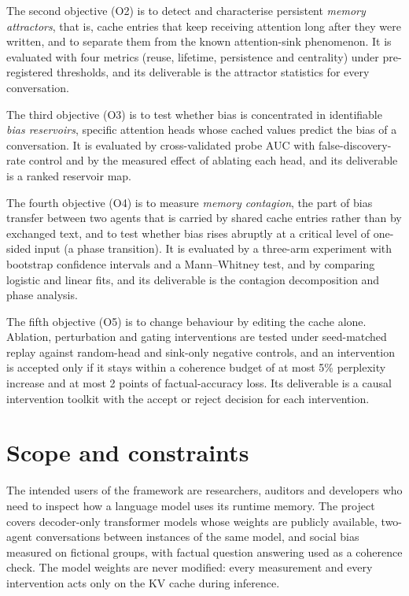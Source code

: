 The second objective (O2) is to detect and characterise persistent \emph{memory attractors}, that is, cache entries that keep receiving attention long after they were written, and to separate them from the known attention-sink phenomenon. It is evaluated with four metrics (reuse, lifetime, persistence and centrality) under pre-registered thresholds, and its deliverable is the attractor statistics for every conversation.

The third objective (O3) is to test whether bias is concentrated in identifiable \emph{bias reservoirs}, specific attention heads whose cached values predict the bias of a conversation. It is evaluated by cross-validated probe AUC with false-discovery-rate control and by the measured effect of ablating each head, and its deliverable is a ranked reservoir map.

The fourth objective (O4) is to measure \emph{memory contagion}, the part of bias transfer between two agents that is carried by shared cache entries rather than by exchanged text, and to test whether bias rises abruptly at a critical level of one-sided input (a phase transition). It is evaluated by a three-arm experiment with bootstrap confidence intervals and a Mann--Whitney test, and by comparing logistic and linear fits, and its deliverable is the contagion decomposition and phase analysis.

The fifth objective (O5) is to change behaviour by editing the cache alone. Ablation, perturbation and gating interventions are tested under seed-matched replay against random-head and sink-only negative controls, and an intervention is accepted only if it stays within a coherence budget of at most 5\% perplexity increase and at most 2 points of factual-accuracy loss. Its deliverable is a causal intervention toolkit with the accept or reject decision for each intervention.

\section{Scope and constraints}
The intended users of the framework are researchers, auditors and developers who need to inspect how a language model uses its runtime memory. The project covers decoder-only transformer models whose weights are publicly available, two-agent conversations between instances of the same model, and social bias measured on fictional groups, with factual question answering used as a coherence check. The model weights are never modified: every measurement and every intervention acts only on the KV cache during inference.

